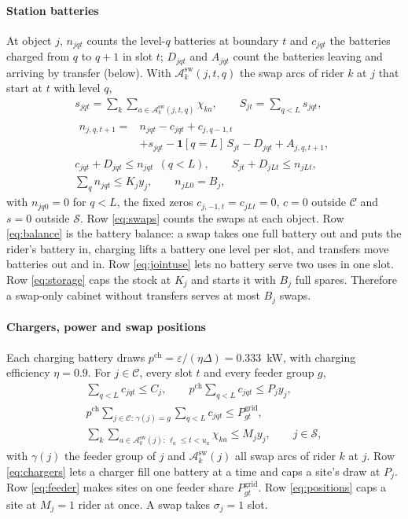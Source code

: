 \paragraph*{Station batteries}
At object $j$, $n_{jqt}$ counts the level-$q$ batteries at boundary $t$ and $c_{jqt}$ the batteries charged from $q$ to $q+1$ in slot $t$; $D_{jqt}$ and $A_{jqt}$ count the batteries leaving and arriving by transfer (below). With $\mathcal A^{\mathrm{sw}}_k(j,t,q)$ the swap arcs of rider $k$ at $j$ that start at $t$ with level $q$,
\begin{gather}
  s_{jqt}=\textstyle\sum_k\sum_{a\in\mathcal A^{\mathrm{sw}}_k(j,t,q)}\chi_{ka},\qquad S_{jt}=\sum_{q<L}s_{jqt},\label{eq:swaps}\\
  \begin{aligned}n_{j,q,t+1}={}&n_{jqt}-c_{jqt}+c_{j,q-1,t}\\&+s_{jqt}-\mathbf 1[q{=}L]\,S_{jt}-D_{jqt}+A_{j,q,t+1},\end{aligned}\label{eq:balance}\\
  c_{jqt}+D_{jqt}\le n_{jqt}\ \ (q<L),\qquad S_{jt}+D_{jLt}\le n_{jLt},\label{eq:jointuse}\\
  \textstyle\sum_{q}n_{jqt}\le K_jy_j,\qquad n_{jL0}=B_j,\label{eq:storage}
\end{gather}
with $n_{jq0}=0$ for $q<L$, the fixed zeros $c_{j,-1,t}=c_{jLt}=0$, $c=0$ outside $\mathcal C$ and $s=0$ outside $\mathcal S$. Row \eqref{eq:swaps} counts the swaps at each object. Row \eqref{eq:balance} is the battery balance: a swap takes one full battery out and puts the rider's battery in, charging lifts a battery one level per slot, and transfers move batteries out and in. Row \eqref{eq:jointuse} lets no battery serve two uses in one slot. Row \eqref{eq:storage} caps the stock at $K_j$ and starts it with $B_j$ full spares. Therefore a swap-only cabinet without transfers serves at most $B_j$ swaps.

\paragraph*{Chargers, power and swap positions}
Each charging battery draws $p^{\mathrm{ch}}=\varepsilon/(\eta\Delta)=0.333$~kW, with charging efficiency $\eta=0.9$. For $j\in\mathcal C$, every slot $t$ and every feeder group $g$,
\begin{gather}
  \textstyle\sum_{q<L}c_{jqt}\le C_j,\qquad p^{\mathrm{ch}}\sum_{q<L}c_{jqt}\le P_jy_j,\label{eq:chargers}\\
  p^{\mathrm{ch}}\textstyle\sum_{j\in\mathcal C:\,\gamma(j)=g}\sum_{q<L}c_{jqt}\le P^{\mathrm{grid}}_{gt},\label{eq:feeder}\\
  \textstyle\sum_k\sum_{a\in\mathcal A^{\mathrm{sw}}_k(j):\,\ell_a\le t<u_a}\chi_{ka}\le M_jy_j,\qquad j\in\mathcal S,\label{eq:positions}
\end{gather}
with $\gamma(j)$ the feeder group of $j$ and $\mathcal A^{\mathrm{sw}}_k(j)$ all swap arcs of rider $k$ at $j$. Row \eqref{eq:chargers} lets a charger fill one battery at a time and caps a site's draw at $P_j$. Row \eqref{eq:feeder} makes sites on one feeder share $P^{\mathrm{grid}}_{gt}$. Row \eqref{eq:positions} caps a site at $M_j=1$ rider at once. A swap takes $\sigma_j=1$ slot.

